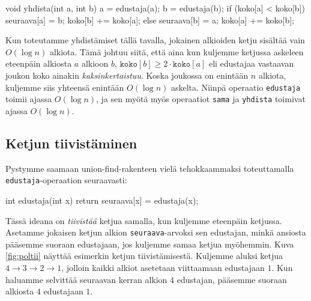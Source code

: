 \begin{code}
void yhdista(int a, int b) {
    a = edustaja(a);
    b = edustaja(b);
    if (koko[a] < koko[b]) {
        seuraava[a] = b;
        koko[b] += koko[a];
    } else {
        seuraava[b] = a;
        koko[a] += koko[b];
    }
}
\end{code}

Kun toteutamme yhdistämiset tällä tavalla, jokainen
alkioiden ketju sisäl\-tää vain $O(\log n)$ alkiota.
Tämä johtuu siitä, että aina kun kuljemme ketjussa
askeleen eteenpäin alkiosta $a$ alkioon $b$,
$\texttt{koko}[b] \ge 2 \cdot \texttt{koko}[a]$ eli
edustajaa vastaavan joukon koko ainakin \emph{kaksinkertaistuu}.
Koska joukossa on enintään $n$ alkiota,
kuljemme siis yhteensä enintään $O(\log n)$ askelta.
Niinpä operaatio \texttt{edustaja} toimii ajassa $O(\log n)$,
ja sen myötä myös operaatiot \texttt{sama} ja \texttt{yhdista}
toimivat ajassa $O(\log n)$.

\subsection{Ketjun tiivistäminen}

Pystymme saamaan union-find-rakenteen vielä tehokkaammaksi
toteuttamalla \texttt{edustaja}-operaation seuraavasti:

\begin{code}
int edustaja(int x) {
    return seuraava[x] = edustaja(x);
}
\end{code}

Tässä ideana on \emph{tiivistää} ketjua samalla,
kun kuljemme eteenpäin ketjussa.
Asetamme jokaisen ketjun alkion \texttt{seuraava}-arvoksi sen edustajan,
minkä ansiosta pääsemme suoraan edustajaan,
jos kuljemme samaa ketjua myöhemmin.
Kuva \ref{fig:poltii} näyttää esimerkin ketjun tiivistämisestä.
Kuljemme aluksi ketjua $4 \rightarrow 3 \rightarrow 2 \rightarrow 1$,
jolloin kaikki alkiot asetetaan viittaamaan edustajaan $1$.
Kun haluamme selvittää seuraavan kerran alkion $4$ edustajan,
pääsemme suoraan alkiosta $4$ edustajaan $1$.

